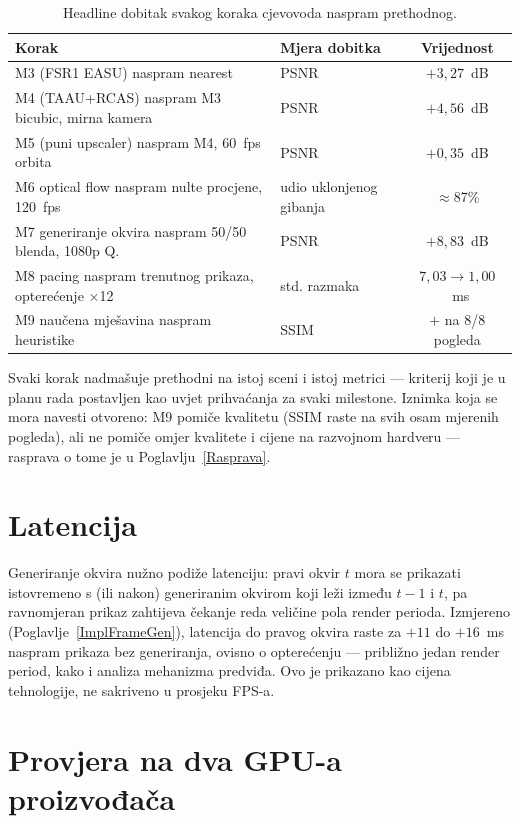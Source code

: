 \documentclass{mathos}
\begin{document}
\begin{table}[hbtp]
\centering
\small
\begin{tabular}{|l|l|c|}\hline
Korak & Mjera dobitka & Vrijednost \\\hline
M3 (FSR1 EASU) naspram nearest & PSNR & $+3,27$~dB \\\hline
M4 (TAAU+RCAS) naspram M3 bicubic, mirna kamera & PSNR & $+4,56$~dB \\\hline
M5 (puni upscaler) naspram M4, 60~fps orbita & PSNR & $+0,35$~dB \\\hline
M6 optical flow naspram nulte procjene, 120~fps & udio uklonjenog gibanja & $\approx$87\% \\\hline
M7 generiranje okvira naspram 50/50 blenda, 1080p Q. & PSNR & $+8,83$~dB \\\hline
M8 pacing naspram trenutnog prikaza, opterećenje $\times$12 & std. razmaka & $7,03\to1,00$~ms \\\hline
M9 naučena mješavina naspram heuristike & SSIM & $+$ na 8/8 pogleda \\\hline
\end{tabular}
\caption{Headline dobitak svakog koraka cjevovoda naspram prethodnog.}
\label{table_ch10_sinteza}
\end{table}

Svaki korak nadmašuje prethodni na istoj sceni i istoj metrici — kriterij koji
je u planu rada postavljen kao uvjet prihvaćanja za svaki milestone. Iznimka
koja se mora navesti otvoreno: M9 pomiče kvalitetu (SSIM raste na svih osam
mjerenih pogleda), ali ne pomiče omjer kvalitete i cijene na razvojnom
hardveru — rasprava o tome je u Poglavlju~\ref{Rasprava}.

\section{Latencija}

Generiranje okvira nužno podiže latenciju: pravi okvir $t$ mora se prikazati
istovremeno s (ili nakon) generiranim okvirom koji leži između $t-1$ i $t$,
pa ravnomjeran prikaz zahtijeva čekanje reda veličine pola render perioda.
Izmjereno (Poglavlje~\ref{ImplFrameGen}), latencija do pravog okvira raste
za $+11$ do $+16$~ms naspram prikaza bez generiranja, ovisno o opterećenju —
približno jedan render period, kako i analiza mehanizma predviđa. Ovo je
prikazano kao cijena tehnologije, ne sakriveno u prosjeku FPS-a.

\section{Provjera na dva GPU-a proizvođača}
\end{document}
